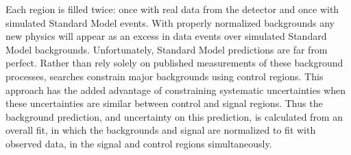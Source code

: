 Each region is filled twice: once with real data from the detector and once with simulated Standard Model events. With properly normalized backgrounds any new physics will appear as an excess in data events over simulated Standard Model backgrounds.
Unfortunately, Standard Model predictions are far from perfect. Rather than rely solely on published measurements of these background processes, searches constrain major backgrounds using control regions. This approach has the added advantage of constraining systematic uncertainties when these uncertainties are similar between control and signal regions. Thus the background prediction, and uncertainty on this prediction, is calculated from an overall fit, in which the backgrounds and signal are normalized to fit with observed data, in the signal and control regions simultaneously.

